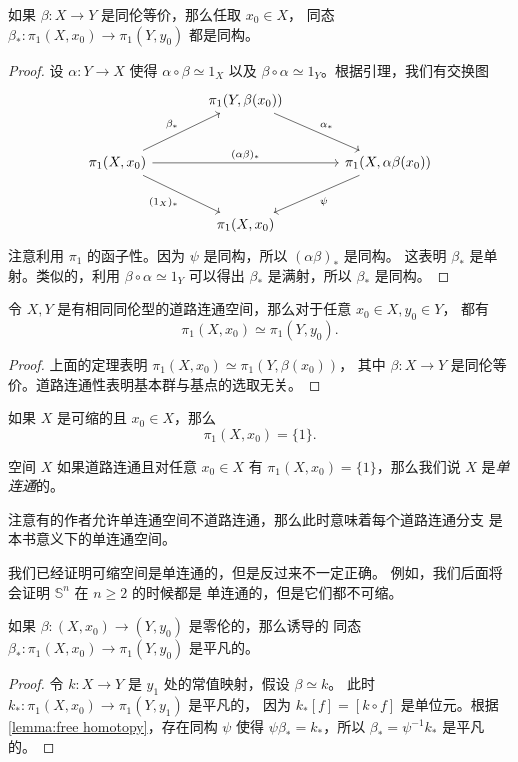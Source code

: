 \documentclass[fontset=none]{Notes}
\begin{document}
\begin{theorem}
  如果 $\beta:X\to Y$ 是同伦等价，那么任取 $x_0\in X$，
  同态 $\beta_*:\pi_1(X,x_0)\to \pi_1(Y,y_0)$ 都是同构。
\end{theorem}
\begin{proof}
  设 $\alpha:Y\to X$ 使得 $\alpha\circ\beta\simeq 1_X$ 以及
  $\beta\circ \alpha\simeq 1_Y$。根据引理，我们有交换图
  \[
    \begin{tikzcd}[sep=large]
      & \pi_1(Y,\beta(x_0))\arrow[dr,"\alpha_*"] & \\
      \pi_1(X,x_0)\arrow[ur,"\beta_*"]\arrow[rr,"(\alpha\beta)_*"]
      \arrow[dr,"(1_X)_*"'] & &
      \pi_1(X,\alpha\beta(x_0))\arrow[dl,"\psi"]\\
      & \pi_1(X,x_0) & 
    \end{tikzcd}
  \]
  注意利用 $\pi_1$ 的函子性。因为 $\psi$ 是同构，所以 $(\alpha\beta)_*$ 是同构。
  这表明 $\beta_*$ 是单射。类似的，利用 $\beta\circ\alpha\simeq 1_Y$
  可以得出 $\beta_*$ 是满射，所以 $\beta_*$ 是同构。
\end{proof}

\begin{corollary}
  令 $X,Y$ 是有相同同伦型的道路连通空间，那么对于任意 $x_0\in X,y_0\in Y$，
  都有
  \[
    \pi_1(X,x_0)\simeq \pi_1(Y,y_0).
  \]
\end{corollary}
\begin{proof}
  上面的定理表明 $\pi_1(X,x_0)\simeq\pi_1(Y,\beta(x_0))$，
  其中 $\beta:X\to Y$ 是同伦等价。道路连通性表明基本群与基点的选取无关。
\end{proof}

\begin{corollary}
  如果 $X$ 是可缩的且 $x_0\in X$，那么
  \[
    \pi_1(X,x_0)=\{1\}.
  \]
\end{corollary}

\begin{definition}
  空间 $X$ 如果道路连通且对任意 $x_0\in X$ 有 $\pi_1(X,x_0)=\{1\}$，那么我们说
  $X$ 是\emph{单连通}的。
\end{definition}

注意有的作者允许单连通空间不道路连通，那么此时意味着每个道路连通分支
是本书意义下的单连通空间。

我们已经证明可缩空间是单连通的，但是反过来不一定正确。
例如，我们后面将会证明 $\mathbb{S}^n$ 在 $n\geq 2$ 的时候都是
单连通的，但是它们都不可缩。


\begin{corollary}
  如果 $\beta:(X,x_0)\to (Y,y_0)$ 是零伦的，那么诱导的
  同态 $\beta_*:\pi_1(X,x_0)\to \pi_1(Y,y_0)$ 是平凡的。
\end{corollary}
\begin{proof}
  令 $k:X\to Y$ 是 $y_1$ 处的常值映射，假设 $\beta\simeq k$。
  此时 $k_*:\pi_1(X,x_0)\to \pi_1(Y,y_1)$ 是平凡的，
  因为 $k_*[f]=[k\circ f]$ 是单位元。根据
  \autoref{lemma:free homotopy}，存在同构 $\psi$
  使得 $\psi\beta_*=k_*$，所以 $\beta_*=\psi^{-1}k_*$
  是平凡的。
\end{proof}
\end{document}
